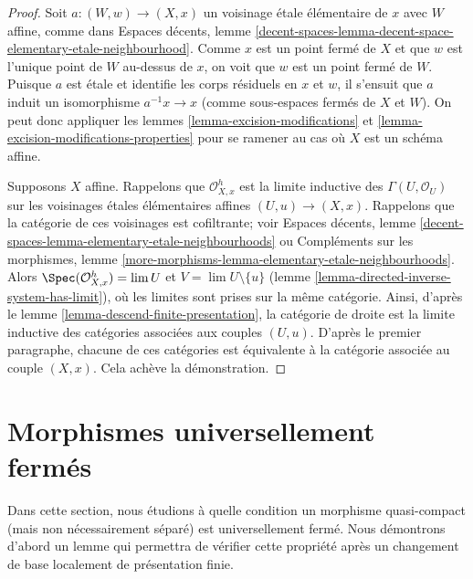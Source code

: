 \begin{proof}
Soit $a : (W, w) \to (X, x)$ un voisinage \'etale élémentaire de $x$
avec $W$ affine, comme dans
Espaces décents, lemme
\ref{decent-spaces-lemma-decent-space-elementary-etale-neighbourhood}.
Comme $x$ est un point fermé de $X$ et que $w$ est l'unique point de $W$
au-dessus de $x$, on voit que $w$ est un point fermé de $W$. Puisque $a$
est \'etale et identifie les corps résiduels en $x$ et $w$, il
s'ensuit que $a$ induit un isomorphisme $a^{-1}x \to x$ (comme sous-espaces
fermés de $X$ et $W$). On peut donc appliquer
les lemmes \ref{lemma-excision-modifications} et
\ref{lemma-excision-modifications-properties}
pour se ramener au cas où $X$ est un schéma affine.

\medskip\noindent
Supposons $X$ affine. Rappelons que $\mathcal{O}_{X, x}^h$
est la limite inductive des $\Gamma(U, \mathcal{O}_U)$ sur les
voisinages \'etales élémentaires affines $(U, u) \to (X, x)$.
Rappelons que la catégorie de ces voisinages est
cofiltrante; voir Espaces décents, lemme
\ref{decent-spaces-lemma-elementary-etale-neighbourhoods} ou
Compléments sur les morphismes, lemme
\ref{more-morphisms-lemma-elementary-etale-neighbourhoods}.
Alors $\Spec(\mathcal{O}_{X, x}^h) = \lim U$ et
$V = \lim U \setminus \{u\}$
(lemme \ref{lemma-directed-inverse-system-has-limit}),
où les limites sont prises sur la même catégorie. Ainsi, d'après
le lemme \ref{lemma-descend-finite-presentation},
la catégorie de droite est la limite inductive des catégories
associées aux couples $(U, u)$. D'après le premier
paragraphe, chacune de ces catégories est équivalente à la
catégorie associée au couple $(X, x)$. Cela achève la démonstration.
\end{proof}






\section{Morphismes universellement fermés}
\label{section-universally-closed}

\noindent
Dans cette section, nous étudions à quelle condition un morphisme quasi-compact
(mais non nécessairement séparé) est universellement fermé. Nous démontrons d'abord un lemme qui
permettra de vérifier cette propriété après un changement de base
localement de présentation finie.

